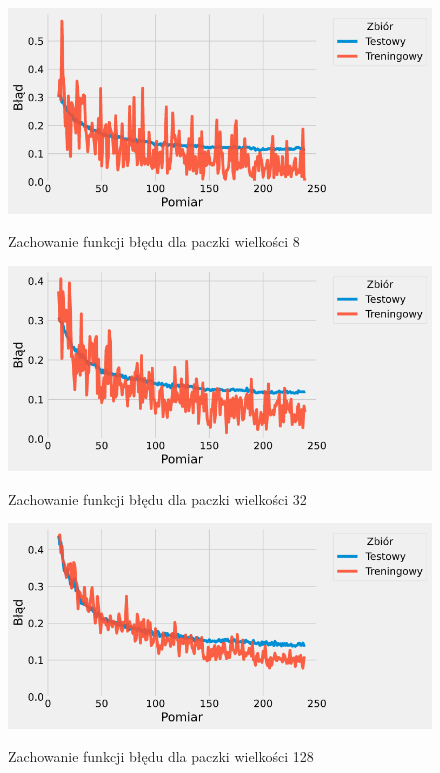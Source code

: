 \documentclass{article}
\begin{document}
\begin{figure}[H]
	\centering
	\caption{Zachowanie funkcji błędu dla paczki wielkości 8}
	\includegraphics[width=\textwidth]{batch_err_8.png}
	\label{fig:res24}
\end{figure}
\begin{figure}[H]
	\centering
	\caption{Zachowanie funkcji błędu dla paczki wielkości 32}
	\includegraphics[width=\textwidth]{batch_err_32.png}
	\label{fig:res25}
\end{figure}
\begin{figure}[H]
	\centering
	\caption{Zachowanie funkcji błędu dla paczki wielkości 128}
	\includegraphics[width=\textwidth]{batch_err_128.png}
	\label{fig:res26}
\end{figure}
\end{document}
